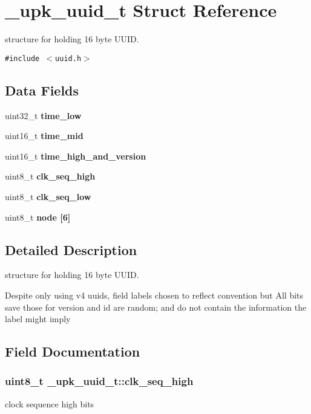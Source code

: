 \section{\_\-upk\_\-uuid\_\-t Struct Reference}
\label{struct__upk__uuid__t}
structure for holding 16 byte UUID.  


{\tt \#include $<$uuid.h$>$}

\subsection*{Data Fields}
\begin{CompactItemize}
\item 
uint32\_\-t \bf{time\_\-low}
\item 
uint16\_\-t \bf{time\_\-mid}
\item 
uint16\_\-t \bf{time\_\-high\_\-and\_\-version}
\item 
uint8\_\-t \bf{clk\_\-seq\_\-high}
\item 
uint8\_\-t \bf{clk\_\-seq\_\-low}
\item 
uint8\_\-t \bf{node} [6]
\end{CompactItemize}


\subsection{Detailed Description}
structure for holding 16 byte UUID. 

Despite only using v4 uuids, field labels chosen to reflect convention but All bits save those for version and id are random; and do not contain the information the label might imply 



\subsection{Field Documentation}
\subsubsection{\setlength{\rightskip}{0pt plus 5cm}uint8\_\-t \bf{\_\-upk\_\-uuid\_\-t::clk\_\-seq\_\-high}}\label{struct__upk__uuid__t_5fbc54e247c77acc0382c9794c5b4171}


clock sequence high bits 
